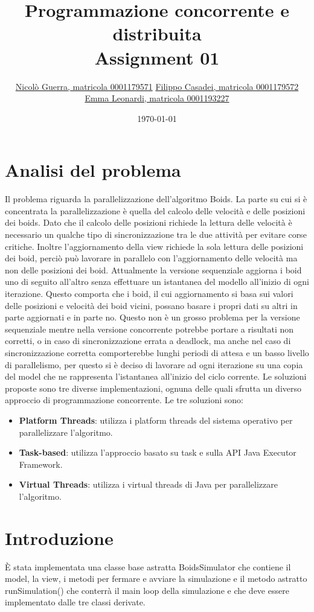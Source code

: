 \documentclass[11pt,notitlepage]{article}
\title{Programmazione concorrente e distribuita \\ Assignment 01}
\author{
    \href{mailto:nicolo.guerra@studio.unibo.it}{Nicolò Guerra, matricola 0001179571}
    \href{mailto:filippo.casadei9@studio.unibo.it}{Filippo Casadei, matricola 0001179572}
    \href{mailto:emma.leonardi2@studio.unibo.it}{Emma Leonardi, matricola 0001193227}
    }
\date{\today}
\begin{document}
\maketitle
\renewcommand{\thesection}{\arabic{section}}
\section{Analisi del problema}
Il problema riguarda la parallelizzazione dell'algoritmo Boids. La parte su cui si è concentrata la parallelizzazione è quella del calcolo delle velocità e delle posizioni dei 
boids. Dato che il calcolo delle posizioni richiede la lettura delle velocità è necessario un qualche tipo di sincronizzazione tra le due attività per evitare corse critiche.
Inoltre l'aggiornamento della view richiede la sola lettura delle posizioni dei boid, perciò può lavorare in parallelo con l'aggiornamento delle velocità ma non delle posizioni dei boid.
Attualmente la versione sequenziale aggiorna i boid uno di seguito all'altro senza effettuare un istantanea del modello all'inizio di ogni iterazione. Questo comporta che i boid,
il cui aggiornamento si basa sui valori delle posizioni e velocità dei boid vicini, possano basare i propri dati su altri in parte aggiornati e in parte no. Questo non è un grosso
problema per la versione sequenziale mentre nella versione concorrente potrebbe portare a risultati non corretti, o in caso di sincronizzazione errata a deadlock, ma anche nel caso di
sincronizzazione corretta comporterebbe lunghi periodi di attesa e un basso livello di parallelismo, per questo si è deciso di lavorare ad ogni iterazione su una copia del model che ne 
rappresenta l'istantanea all'inizio del ciclo corrente.
Le soluzioni proposte sono tre diverse implementazioni, ognuna delle quali sfrutta un diverso approccio di programmazione concorrente. 
Le tre soluzioni sono: 
\begin{itemize}
    \item \textbf{Platform Threads}: utilizza i platform threads del sistema operativo per parallelizzare l'algoritmo.
    \item \textbf{Task-based}: utilizza l'approccio basato su task e sulla API Java Executor Framework.
    \item \textbf{Virtual Threads}: utilizza i virtual threads di Java per parallelizzare l'algoritmo.
\end{itemize}

\section{Introduzione}
È stata implementata una classe base astratta \textsf{BoidsSimulator} che contiene il model, la view, i metodi per fermare e avviare la simulazione e il metodo astratto 
\textsf{runSimulation()} che conterrà il main loop della simulazione e che deve essere implementato dalle tre classi derivate.
\end{document}

